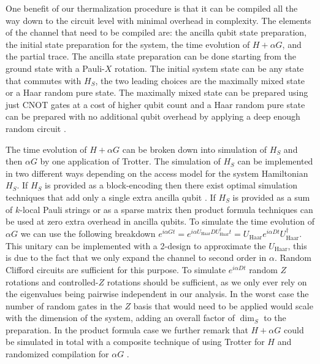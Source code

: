 \documentclass[
 amsmath,amssymb,
 aps,
onecolumn, 
nofootinbib]{revtex4-2}
\newcommand{\haar}{\text{Haar}}
\begin{document}
One benefit of our thermalization procedure is that it can be compiled all the way down to the circuit level with minimal overhead in complexity. The elements of the channel that need to be compiled are: the ancilla qubit state preparation, the initial state preparation for the system, the time evolution of $H + \alpha G$, and the partial trace. The ancilla state preparation can be done starting from the ground state with a Pauli-$X$ rotation. The initial system state can be any state that commutes with $H_S$, the two leading choices are the maximally mixed state or a Haar random pure state. The maximally mixed state can be prepared using just CNOT gates at a cost of higher qubit count and a Haar random pure state can be prepared with no additional qubit overhead by applying a deep enough random circuit \cite{choi2023preparing}. 

The time evolution of $H + \alpha G$ can be broken down into simulation of $H_S$ and then $\alpha G$ by one application of Trotter. The simulation of $H_S$ can be implemented in two different ways depending on the access model for the system Hamiltonian $H_S$. If $H_S$ is provided as a block-encoding then there exist optimal simulation techniques that add only a single extra ancilla qubit \cite{low2019hamiltonian}. If $H_S$ is provided as a sum of $k$-local Pauli strings or as a sparse matrix then product formula techniques can be used \cite{childs2021theory} at zero extra overhead in ancilla qubits. To simulate the time evolution of $\alpha G$ we can use the following breakdown $e^{i \alpha G t} = e^{i \alpha U_{\haar} D U_{\haar}^\dagger t} = U_{\haar} e^{i \alpha  D  t}U_{\haar}^\dagger$. This unitary can be implemented with a 2-design to approximate the $U_{\haar}$, this is due to the fact that we only expand the channel to second order in $\alpha$. Random Clifford circuits \cite{webb2015clifford} are sufficient for this purpose. To simulate $e^{i \alpha D t}$ random $Z$ rotations and controlled-$Z$ rotations should be sufficient, as we only ever rely on the eigenvalues being pairwise independent in our analysis. In the worst case the number of random gates in the $Z$ basis that would need to be applied would scale with the dimension of the system, adding an overall factor of $\dim_S$ to the preparation. In the product formula case we further remark that $H + \alpha G$ could be simulated in total with a composite technique of using Trotter for $H$ and randomized compilation for $\alpha G$ \cite{hagan2023composite}. 
\end{document}
